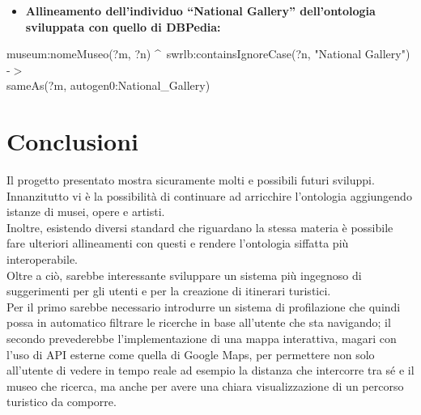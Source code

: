 \documentclass[12pt]{article}
\begin{document}
\begin{itemize}
 \item \textbf{Allineamento dell’individuo “National Gallery” dell’ontologia sviluppata con quello di DBPedia:}
\end{itemize} 
\begin{center}
museum:nomeMuseo(?m, ?n) \textasciicircum \,
swrlb:containsIgnoreCase(?n, "National Gallery") \\
-$>$ \\
sameAs(?m, autogen0:National\_Gallery)
\end{center}
\newpage
\section{Conclusioni}
Il progetto presentato mostra sicuramente molti e possibili futuri sviluppi. Innanzitutto vi è la possibilità di continuare ad arricchire l'ontologia
aggiungendo istanze di musei, opere e artisti.\\
Inoltre, esistendo diversi standard che riguardano la stessa materia è possibile fare ulteriori
allineamenti con questi e rendere l'ontologia siffatta più interoperabile. \\
Oltre a ciò, sarebbe interessante sviluppare un sistema più ingegnoso di suggerimenti per gli utenti e per la creazione di itinerari turistici.\\
Per il primo sarebbe necessario introdurre un sistema di profilazione che quindi possa in automatico filtrare le ricerche in base all'utente che sta navigando;
il secondo prevederebbe l'implementazione di una mappa interattiva, magari con l'uso di API esterne come quella di Google Maps, per permettere non solo all'utente
di vedere in tempo reale ad esempio la distanza che intercorre tra sé e il museo che ricerca, ma anche per avere una chiara visualizzazione di un percorso turistico
da comporre.
\newpage
\printbibliography
\end{document}
